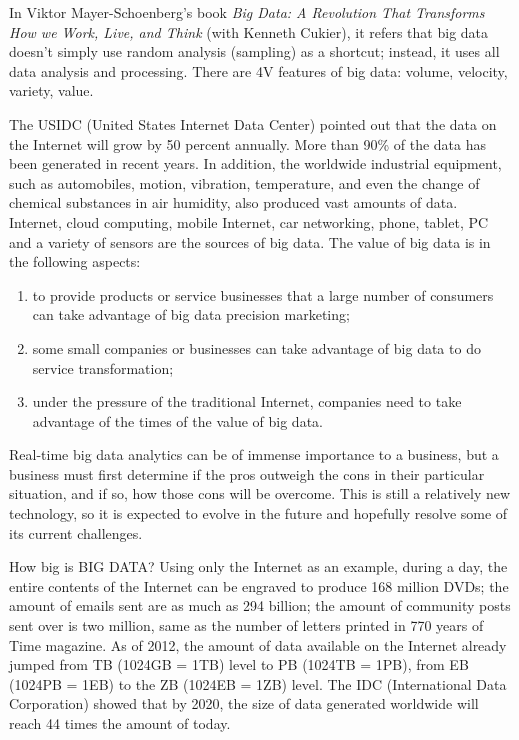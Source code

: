 In Viktor Mayer-Schoenberg's book \textit{Big Data: A Revolution That Transforms How we Work, Live, and Think} (with Kenneth Cukier), it refers that big data doesn't simply use random analysis (sampling) as a shortcut; instead, it uses all data analysis and processing. There are 4V features of big data: volume, velocity, variety, value.

The USIDC (United States Internet Data Center) pointed out that the data on the Internet will grow by 50 percent annually. More than 90\% of the data has been generated in recent years. In addition, the worldwide industrial equipment, such as automobiles, motion, vibration, temperature, and even the change of chemical substances in air humidity, also produced vast amounts of data. Internet, cloud computing, mobile Internet, car networking, phone, tablet, PC and a variety of sensors are the sources of big data. The value of big data is in the following aspects:

\begin{enumerate}
  \item to provide products or service businesses that a large number of consumers can take advantage of big data precision marketing;
  \item some small companies or businesses can take advantage of big data to do service transformation;
  \item under the pressure of the traditional Internet, companies need to take advantage of the times of the value of big data.
\end{enumerate}

Real-time big data analytics can be of immense importance to a business, but a business must first determine if the pros outweigh the cons in their particular situation, and if so, how those cons will be overcome. This is still a relatively new technology, so it is expected to evolve in the future and hopefully resolve some of its current challenges.

How big is BIG DATA? Using only the Internet as an example, during a day, the entire contents of the Internet can be engraved to produce 168 million DVDs; the amount of emails sent are as much as 294 billion; the amount of community posts sent over is two million, same as the number of letters printed in 770 years of Time magazine. As of 2012, the amount of data available on the Internet already jumped from TB (1024GB = 1TB) level to PB (1024TB = 1PB), from EB (1024PB = 1EB) to the ZB (1024EB = 1ZB) level. The IDC (International Data Corporation) showed that by 2020, the size of data generated worldwide will reach 44 times the amount of today.

